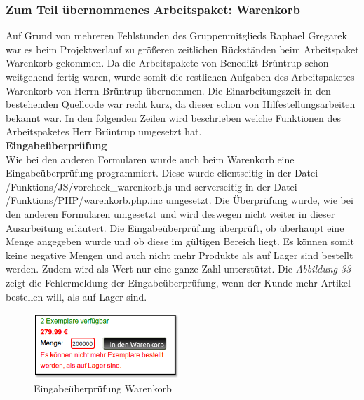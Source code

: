 \subsubsection{Zum Teil übernommenes Arbeitspaket: Warenkorb}
Auf Grund von mehreren Fehlstunden des Gruppenmitglieds Raphael Gregarek war es beim Projektverlauf zu größeren zeitlichen Rückständen beim Arbeitspaket \glqq Warenkorb\grqq{} gekommen. Da die Arbeitspakete von Benedikt Brüntrup schon weitgehend fertig waren, wurde somit die restlichen Aufgaben des Arbeitspaketes \glqq Warenkorb\grqq{} von Herrn Brüntrup übernommen. Die Einarbeitungszeit in den bestehenden Quellcode war recht kurz, da dieser schon von Hilfestellungsarbeiten bekannt war. In den folgenden Zeilen wird beschrieben welche Funktionen des Arbeitspaketes Herr Brüntrup umgesetzt hat.\\

\newpage
\textbf{Eingabeüberprüfung}\\
Wie bei den anderen Formularen wurde auch beim Warenkorb eine Eingabeüberprüfung programmiert. Diese wurde clientseitig in der Datei \glqq /Funktions/JS/vorcheck\_warenkorb.js\grqq{} und serverseitig in der Datei \glqq /Funktions/PHP/warenkorb.php.inc\grqq{} umgesetzt. Die Überprüfung wurde, wie bei den anderen Formularen umgesetzt und wird deswegen nicht weiter in dieser Ausarbeitung erläutert. Die Eingabeüberprüfung überprüft, ob überhaupt eine Menge angegeben wurde und ob diese im gültigen Bereich liegt. Es können somit keine negative Mengen und auch nicht mehr Produkte als auf Lager sind bestellt werden. Zudem wird als Wert nur eine ganze Zahl unterstützt. Die \textit{Abbildung 33} zeigt die Fehlermeldung der Eingabeüberprüfung, wenn der Kunde mehr Artikel bestellen will, als auf Lager sind.\\

\begin{figure}[H]
	\begin{center}
			\includegraphics[width=55mm]{Bilder/warenkorb_eingabepruefung.png}
	\end{center}
	\caption{Eingabeüberprüfung Warenkorb}
\end{figure}

